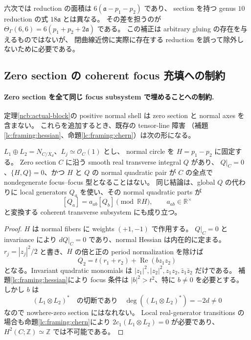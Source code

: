 六次では reduction の面積は $6(\mathfrak a-p_1-p_2)$ であり、
section を持つ genus $10$ reduction の式 $18\mathfrak a$ とは異なる。
その差を担うのが $\Theta_\Gamma(6,6)=6(p_1+p_2+2\mathfrak a)$ である。
この補正は arbitrary gluing の存在を与えるものではないが、
閉曲線近傍に実際に存在する reduction を誤って除外しないために必要である。


\subsection{Zero section の coherent focus 充填への制約}

\paragraph{Zero section を全て同じ focus subsystem で埋めることへの制約.}
定理\ref{ncb:actual-block}の positive normal shell は zero section と normal axes を含まない。
これらを追加するとき、既存の tensor-line 障害
（補題\ref{lc:framing:hessian}、命題\ref{lc:framing:chern}）は次の形になる。

\begin{corollary}
\label{ncb:closed-focus-obstruction}
$L_1\oplus L_2=N_{C/X_d}$、$L_j\simeq\mathcal O_C(1)$ とし、
normal circle を $H=p_1-p_2$ に固定する。
Zero section $C$ に沿う smooth real transverse integral $Q$ があり、
$Q|_C=0$、$\{H,Q\}=0$、かつ $H$ と $Q$ の normal quadratic pair が
$C$ の全点で nondegenerate focus--focus 型となることはない。
同じ結論は、global $Q$ の代わりに local generators $Q_a$ を使い、その normal quadratic parts が
\[
 [Q_a]=a_{ab}[Q_b]\pmod{\mathbb R H},\qquad a_{ab}\in\mathbb R^\times
\]
と変換する coherent transverse subsystem にも成り立つ。
\end{corollary}

\begin{proof}
$H$ は normal fibers に weights $(+1,-1)$ で作用する。
$Q|_C=0$ と invariance により $dQ|_C=0$ であり、normal Hessian は内在的に定まる。
$r_j=|z_j|^2/2$ と書き、$H$ の倍と正の period normalization を除けば
\[
 Q_2=t(r_1+r_2)+\operatorname{Re}(b z_1z_2)
\]
となる。Invariant quadratic monomials は $|z_1|^2,|z_2|^2,z_1z_2,\bar z_1\bar z_2$ だけである。
補題\ref{lc:framing:hessian}により focus 条件は $|b|^2>t^2$、特に $b\ne0$ を必要とする。
しかし $b$ は
\[
 (L_1\otimes L_2)^*\quad\text{の切断であり}\quad
 \deg((L_1\otimes L_2)^*)=-2d\ne0
\]
なので nowhere-zero section にはなれない。
Local real-generator transitions の場合も命題\ref{lc:framing:chern}により
$2c_1(L_1\otimes L_2)=0$ が必要であり、$H^2(C;\mathbb Z)\simeq\mathbb Z$ では不可能である。
\end{proof}

